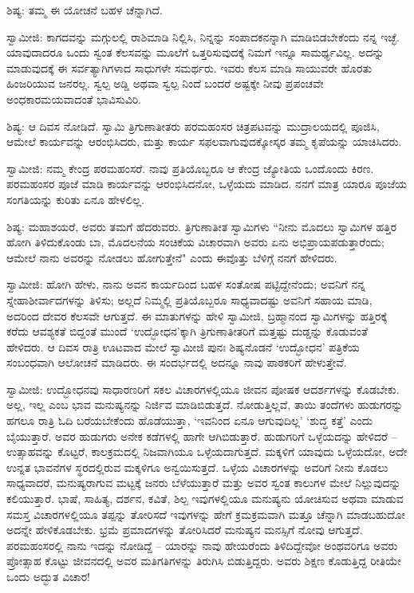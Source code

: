 ಶಿಷ್ಯ: ತಮ್ಮ ಈ ಯೋಚನೆ ಬಹಳ ಚೆನ್ನಾಗಿದೆ.

ಸ್ವಾಮೀಜಿ: ಕಾಗದವನ್ನು ಮಗ್ಗುಲಲ್ಲಿ ರಾಶಿಮಾಡಿ ನಿಲ್ಲಿಸಿ, ನಿನ್ನನ್ನು ಸಂಪಾದಕನನ್ನಾಗಿ ಮಾಡಿಬಿಡಬೇಕೆಂದು ನನ್ನ ಇಚ್ಛೆ. ಯಾವುದಾದರೂ ಒಂದು ಸ್ವಂತ ಕೆಲಸವನ್ನು ಮೂಲೆಗೆ ಒತ್ತರಿಸುವುದಕ್ಕೆ ನಿಮಗೆ ಇನ್ನೂ ಸಾಮರ್ಥ್ಯವಿಲ್ಲ. ಅದನ್ನು ಮಾಡುವುದಕ್ಕೆ ಈ ಸರ್ವತ್ಯಾಗಿಗಳಾದ ಸಾಧುಗಳೇ ಸಮರ್ಥರು. ಇವರು ಕೆಲಸ ಮಾಡಿ ಸಾಯುವರೇ ಹೊರತು ಹಿಂಜರಿಯುವ ಜನರಲ್ಲ. ಸ್ವಲ್ಪ ಅಡ್ಡಿ ಅಥವಾ ಸ್ವಲ್ಪ ನಿಂದೆ ಬಂದರೆ ಅಷ್ಟಕ್ಕೇ ನೀವು ಪ್ರಪಂಚವೇ ಅಂಧಕಾರಮಯವಾದಂತೆ ಭಾವಿಸುವಿರಿ.

ಶಿಷ್ಯ: ಆ ದಿವಸ ನೋಡಿದೆ. ಸ್ವಾಮಿ ತ್ರಿಗುಣಾತೀತರು ಪರಮಹಂಸರ ಚಿತ್ರಪಟವನ್ನು ಮುದ್ರಾಲಯದಲ್ಲಿ ಪೂಜಿಸಿ, ಆಮೇಲೆ ಕಾರ್ಯವನ್ನು ಆರಂಭಿಸಿದರು, ಮತ್ತು ಕಾರ್ಯ ಸಫಲವಾಗುವುದಕ್ಕೋಸ್ಕರ ತಮ್ಮ ಕೃಪೆಯನ್ನು ಯಾಚಿಸಿದರು.

ಸ್ವಾಮೀಜಿ: ನಮ್ಮ ಕೇಂದ್ರ ಪರಮಹಂಸರೆ. ನಾವು ಪ್ರತಿಯೊಬ್ಬರೂ ಆ ಕೇಂದ್ರ ಜ್ಯೋತಿಯ ಒಂದೊಂದು ಕಿರಣ. ಪರಮಹಂಸರ ಪೂಜೆ ಮಾಡಿ ಕಾರ್ಯವನ್ನು ಆರಂಭಿಸಿದನೋ, ಒಳ್ಳೆಯದು ಮಾಡಿದ. ನನಗೆ ಮಾತ್ರ ಯಾರೂ ಪೂಜೆಯ ಸಂಗತಿಯನ್ನು ಕುರಿತು ಏನೂ ಹೇಳಲಿಲ್ಲ.

ಶಿಷ್ಯ: ಮಹಾಶಯರೆ, ಅವರು ತಮಗೆ ಹೆದರುವರು. ತ್ರಿಗುಣಾತೀತ ಸ್ವಾಮಿಗಳು “ನೀನು ಮೊದಲು ಸ್ವಾಮಿಗಳ ಹತ್ತಿರ ಹೋಗಿ ತಿಳಿದುಕೊಂಡು ಬಾ, ಮೊದಲನೆಯ ಸಂಚಿಕೆಯ ವಿಚಾರವಾಗಿ ಅವರು ಏನು ಅಭಿಪ್ರಾಯಪಡುತ್ತಾರೆಂದು; ಆಮೇಲೆ ನಾನು ಅವರನ್ನು ನೋಡಲು ಹೋಗುತ್ತೇನೆ" ಎಂದು ಈವೊತ್ತು ಬೆಳಿಗ್ಗೆ ನನಗೆ ಹೇಳಿದರು.

ಸ್ವಾಮೀಜಿ: ಹೋಗಿ ಹೇಳು, ನಾನು ಅವನ ಕಾರ್ಯದಿಂದ ಬಹಳ ಸಂತೋಷ ಪಟ್ಟಿದ್ದೇನೆಂದು; ಅವನಿಗೆ ನನ್ನ ಸ್ನೇಹಾಶೀರ್ವಾದಗಳನ್ನು ತಿಳಿಸು; ಅಲ್ಲದೆ ನಿಮ್ಮಲ್ಲಿ ಪ್ರತಿಯೊಬ್ಬರೂ ಸಾಧ್ಯವಾದಷ್ಟು ಅವನಿಗೆ ಸಹಾಯ ಮಾಡಿ, ಅದರಿಂದ ದೇವರ ಕೆಲಸವೇ ಆಗುತ್ತದೆ. ಈ ಮಾತುಗಳನ್ನು ಹೇಳಿ ಸ್ವಾಮೀಜಿ, ಬ್ರಹ್ಮಾನಂದ ಸ್ವಾಮಿಗಳನ್ನು ಹತ್ತಿರಕ್ಕೆ ಕರೆದು ಆವಶ್ಯಕತೆ ಬಿದ್ದಂತೆ ಮುಂದೆ ‘ಉದ್ಭೋಧನ’ಕ್ಕಾಗಿ ತ್ರಿಗುಣಾತೀತರಿಗೆ ಮತ್ತಷ್ಟು ದುಡ್ಡನ್ನು ಕೊಡುವಂತೆ ಹೇಳಿದರು. ಆ ದಿವಸ ರಾತ್ರಿ ಊಟವಾದ ಮೇಲೆ ಸ್ವಾಮೀಜಿ ಪುನಃ ಶಿಷ್ಯನೊಡನೆ ‘ಉದ್ಭೋಧನ’ ಪತ್ರಿಕೆಯ ಸಂಬಂಧವಾಗಿ ಆಲೋಚನೆ ಮಾಡಿದರು. ಈ ಸಂದರ್ಭದಲ್ಲಿ ಅದನ್ನೂ ನಾವು ಪಾಠಕರಿಗೆ ಹೇಳುತ್ತೇವೆ.

ಸ್ವಾಮೀಜಿ: ಉದ್ಭೋಧನವು ಸಾಧಾರಣರಿಗೆ ಸಕಲ ವಿಚಾರಗಳಲ್ಲಿಯೂ ಜೀವನ ಪೋಷಕ ಆದರ್ಶಗಳನ್ನು ಕೊಡಬೇಕು. ಅಲ್ಲ, ಇಲ್ಲ ಎಂಬ ಭಾವ ಮನುಷ್ಯನನ್ನು ನಿರ್ಜಿವ ಮಾಡಿಬಿಡುತ್ತದೆ. ನೋಡುತ್ತಿಲ್ಲವೆ, ತಾಯಿ ತಂದೆಗಳು ಹುಡುಗರನ್ನು ಹಗಲೂ ರಾತ್ರಿ ಓದಿ ಬರೆಯಬೇಕೆಂದು ಹೊಡೆಯುತ್ತಾ, ‘ಇವನಿಂದ ಏನೂ ಆಗುವುದಿಲ್ಲ’ ‘ಶುದ್ಧ ಕತ್ತೆ’ ಎಂದು ಬೈಯುತ್ತಾರೆ. ಅವರ ಹುಡುಗರು ಅನೇಕ ಕಡೆಗಳಲ್ಲಿ ಹಾಗೇ ಆಗಿಬಿಡುತ್ತಾರೆ. ಹುಡುಗರಿಗೆ ಒಳ್ಳೆಯದನ್ನು ಹೇಳಿದರೆ – ಉತ್ಸಾಹವನ್ನು ಕೊಟ್ಟರೆ, ಕಾಲಕ್ರಮದಲ್ಲಿ ನಿಜವಾಗಿಯೂ ಒಳ್ಳೆಯದಾಗುತ್ತದೆ. ಮಕ್ಕಳಿಗೆ ಯಾವುದು ಒಳ್ಳೆಯದೋ, ಅದೇ ಉನ್ನತ ಭಾವನೆಗಳ ಸ್ಥರದಲ್ಲಿರುವ ಮಕ್ಕಳಿಗೂ ಅನ್ವಯಿಸುತ್ತದೆ. ಒಳ್ಳೆಯ ವಿಚಾರಗಳನ್ನು ಅವರಿಗೆ ನೀನು ಕೊಡಲು ಸಾಧ್ಯವಾದರೆ, ಮನುಷ್ಯರಾಗುವ ಮಟ್ಟಕ್ಕೆ ಜನರು ಬೆಳೆಯುತ್ತಾರೆ ಮತ್ತು ಅವರ ಸ್ವಂತ ಕಾಲುಗಳ ಮೇಲೆ ನಿಲ್ಲುವುದನ್ನು ಕಲಿಯುತ್ತಾರೆ. ಭಾಷೆ, ಸಾಹಿತ್ಯ, ದರ್ಶನ, ಕವಿತೆ, ಶಿಲ್ಪ ಇವುಗಳಲ್ಲಿಯೂ ಮನುಷ್ಯನು ಯೋಚಿಸುವ ಅಥವಾ ಮಾಡುವ ಸಮಸ್ತ ವಿಚಾರಗಳಲ್ಲಿಯೂ ತಪ್ಪನ್ನು ತೋರಿಸದೆ ಇವುಗಳನ್ನು ಹೇಗೆ ಕ್ರಮಕ್ರಮವಾಗಿ ಮತ್ತೂ ಚೆನ್ನಾಗಿ ಮಾಡಬಹುದೋ ಅದನ್ನೇ ಹೇಳಿಕೊಡಬೇಕು. ಭ್ರಮೆ ಪ್ರಮಾದಗಳನ್ನು ತೋರಿಸಿದರೆ ಮನುಷ್ಯನ ಮನಸ್ಸಿಗೆ ನೋವು ಆಗುತ್ತದೆ. ಪರಮಹಂಸರಲ್ಲಿ ನಾನು ಇದನ್ನು ನೋಡಿದ್ದೆ – ಯಾರನ್ನು ನಾವು ಹೇಯರೆಂದು ತಿಳಿದಿದ್ದೇವೋ ಅಂಥವರಿಗೂ ಅವರು ಪ್ರೋತ್ಸಾಹ ಕೊಟ್ಟು ಜೀವನದಲ್ಲಿ ಅವರ ಮತಿಗತಿಗಳನ್ನು ತಿರುಗಿಸಿ ಬಿಡುತ್ತಿದ್ದರು. ಅವರು ಶಿಕ್ಷಣ ಕೊಡುತ್ತಿದ್ದ ರೀತಿಯೇ ಒಂದು ಅದ್ಭುತ ವಿಚಾರ!

